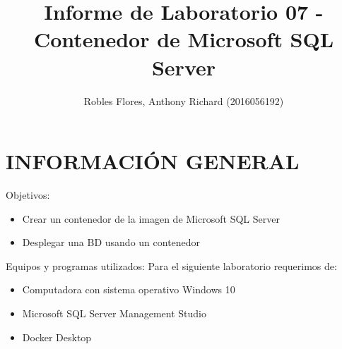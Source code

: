 \documentclass[preprint,12pt]{elsarticle}
\begin{document}
	\begin{frontmatter}
		\title{\huge Informe de Laboratorio 07 - Contenedor de Microsoft SQL Server}
		\author{Robles Flores, Anthony Richard              	(2016056192)}	
		\address{Universidad Privada de Tacna}
		\address{Escuela Profesional de Ingeniería de Sistemas}
		\address{Tacna, Perú}
	\end{frontmatter}

\section{INFORMACIÓN GENERAL}
Objetivos:
\begin{itemize}
\item Crear un contenedor de la imagen de Microsoft SQL Server 
\item Desplegar una BD usando un contenedor
\end{itemize}
Equipos y programas utilizados:
Para el siguiente laboratorio requerimos de:
\begin{itemize}
\item Computadora con sistema operativo Windows 10
\item Microsoft SQL Server Management Studio
\item Docker Desktop
\end{itemize}

\end{document}
